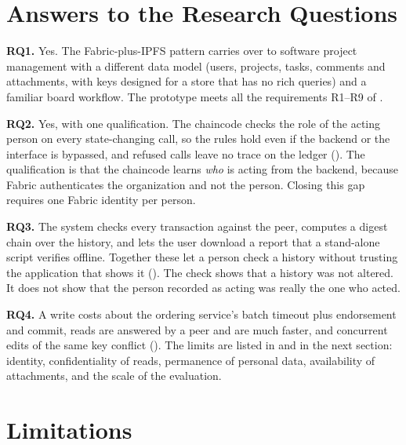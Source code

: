 \section{Answers to the Research Questions}
\label{sec:rq-answers}

\textbf{RQ1.} Yes. The Fabric-plus-IPFS pattern carries over to software project management with a different data model (users, projects, tasks, comments and attachments, with keys designed for a store that has no rich queries) and a familiar board workflow. The prototype meets all the requirements R1--R9 of .

\textbf{RQ2.} Yes, with one qualification. The chaincode checks the role of the acting person on every state-changing call, so the rules hold even if the backend or the interface is bypassed, and refused calls leave no trace on the ledger (). The qualification is that the chaincode learns \emph{who} is acting from the backend, because Fabric authenticates the organization and not the person. Closing this gap requires one Fabric identity per person.

\textbf{RQ3.} The system checks every transaction against the peer, computes a digest chain over the history, and lets the user download a report that a stand-alone script verifies offline. Together these let a person check a history without trusting the application that shows it (). The check shows that a history was not altered. It does not show that the person recorded as acting was really the one who acted.

\textbf{RQ4.} A write costs about the ordering service's batch timeout plus endorsement and commit, reads are answered by a peer and are much faster, and concurrent edits of the same key conflict (). The limits are listed in  and in the next section: identity, confidentiality of reads, permanence of personal data, availability of attachments, and the scale of the evaluation.

\section{Limitations}
\label{sec:limitations}

